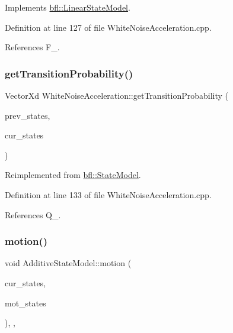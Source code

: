 Implements \mbox{\hyperlink{classbfl_1_1LinearStateModel_a58db2093c6d255b8d41dbf0f0c5c28e5}{bfl\+::\+Linear\+State\+Model}}.



Definition at line 127 of file White\+Noise\+Acceleration.\+cpp.



References F\+\_\+.

\mbox{\label{classbfl_1_1WhiteNoiseAcceleration_a10d81273e59d14f7d7ce794533c122a8}} 
\subsubsection{\texorpdfstring{get\+Transition\+Probability()}{getTransitionProbability()}}
{\footnotesize\ttfamily Vector\+Xd White\+Noise\+Acceleration\+::get\+Transition\+Probability (\begin{DoxyParamCaption}\item[{const Eigen\+::\+Ref$<$ const Eigen\+::\+Matrix\+Xd $>$ \&}]{prev\+\_\+states,  }\item[{Eigen\+::\+Ref$<$ Eigen\+::\+Matrix\+Xd $>$}]{cur\+\_\+states }\end{DoxyParamCaption})\hspace{0.3cm}{\ttfamily [virtual]}}



Reimplemented from \mbox{\hyperlink{classbfl_1_1StateModel_acb582cb7d41ec7b854ed1dbd8965b6fc}{bfl\+::\+State\+Model}}.



Definition at line 133 of file White\+Noise\+Acceleration.\+cpp.



References Q\+\_\+.

\mbox{\label{classbfl_1_1AdditiveStateModel_a9f145bf8c592fc0092d84421f26dbb8b}} 
\subsubsection{\texorpdfstring{motion()}{motion()}}
{\footnotesize\ttfamily void Additive\+State\+Model\+::motion (\begin{DoxyParamCaption}\item[{const Eigen\+::\+Ref$<$ const Eigen\+::\+Matrix\+Xd $>$ \&}]{cur\+\_\+states,  }\item[{Eigen\+::\+Ref$<$ Eigen\+::\+Matrix\+Xd $>$}]{mot\+\_\+states }\end{DoxyParamCaption})\hspace{0.3cm}{\ttfamily [override]}, {\ttfamily [virtual]}, {\ttfamily [inherited]}}



